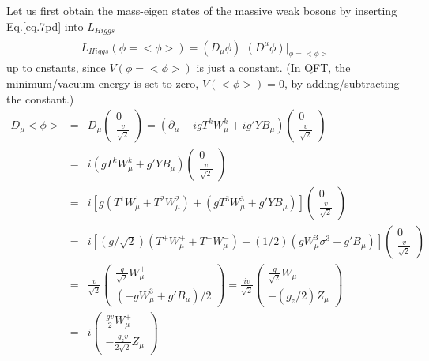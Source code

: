 \documentclass[12pt]{article}
\def\del{{\partial}}
\begin{document}
  Let us first obtain the mass-eigen states of the massive
  weak bosons by inserting Eq.\ref{eq.7pd} into $L_{Higgs}$
\begin{eqnarray}
  L_{Higgs}(\phi=<\phi>)
  = (D_\mu \phi)^\dagger (D^\mu \phi)|_{\phi=<\phi>} \label{eq.7LHiggs}
\end{eqnarray}
  up to cnstants, since $V(\phi=<\phi>)$ is just a constant.
  (In QFT, the minimum/vacuum energy is set to zero,
  $V(<\phi>)=0$, by adding/subtracting the constant.)
\begin{eqnarray}
  D_\mu <\phi>
  &=& D_\mu
  \begin{pmatrix}
    0 \\ \frac{v}{\sqrt 2}
  \end{pmatrix}
  =(\del_\mu + i g T^k W^k_\mu + i g' Y B_\mu)
  \begin{pmatrix}
    0 \\ \frac{v}{\sqrt 2}
  \end{pmatrix} \\ 
  &=&i( g T^k W^k_\mu + g' Y B_\mu)
  \begin{pmatrix}
    0 \\ \frac{v}{\sqrt 2}
  \end{pmatrix} \\
  &=&i[g(T^1W^1_\mu+T^2W^2_\mu) + (gT^3W^3_\mu+g'YB_\mu)]
  \begin{pmatrix}
    0 \\ \frac{v}{\sqrt 2}
  \end{pmatrix} \\
  &=&i[(g/\sqrt2)(T^+W^+_\mu+T^-W^-_\mu)+(1/2)(gW^3_\mu \sigma^3+g'B_\mu)]
  \begin{pmatrix}
    0 \\ \frac{v}{\sqrt 2}
  \end{pmatrix} \\
  &=&\frac{v}{\sqrt 2}
  \begin{pmatrix}
    \frac{g}{\sqrt 2} W^+_\mu \\ (-gW^3_\mu+g'B_\mu)/2
  \end{pmatrix} 
   =\frac{iv}{\sqrt 2} 
   \begin{pmatrix}
    \frac{g}{\sqrt 2} W^+_\mu \\ -(g_z/2) Z_\mu
  \end{pmatrix}\\
   &=& i
   \begin{pmatrix}
    \frac{gv}{2} W^+_\mu \\ -\frac{g_zv}{2\sqrt2} Z_\mu
   \end{pmatrix} \label{eq.7ppsi}
\end{eqnarray}
\end{document}
